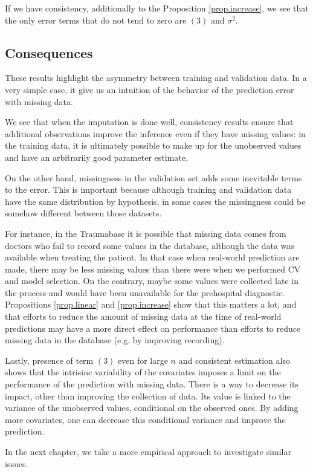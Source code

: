 If we have consistency, additionally to the Proposition \ref{prop.increase}, we see that the only error terms that do not tend to zero are $(3)$ and $\sigma^2$. 

		\subsection{Consequences}
These results highlight the asymmetry between training and validation data. In a very simple case, it give us an intuition of the behavior of the prediction error with missing data.

We see that when the imputation is done well, consistency results ensure that additional observations improve the inference even if they have missing values: in the training data, it is ultimately possible to make up for the unobserved values and have an arbitrarily good parameter estimate.

On the other hand, missingness in the validation set adds some inevitable terms to the error. This is important because although training and validation data have the same distribution by hypothesis, in some cases the missingness could be somehow different between those datasets.  

For instance, in the Traumabase it is possible that missing data comes from doctors who fail to record some values in the database, although the data was available when treating the patient. In that case when real-world prediction are made, there may be less missing values than there were when we performed CV and model selection. On the contrary, maybe some values were collected late in the process and would have been unavailable for the prehospital diagnostic. Propositions \ref{prop.linear} and \ref{prop.increase} show that this matters a lot, and that efforts to reduce the amount of missing data at the time of real-world predictions may have a more direct effect on performance than efforts to reduce missing data in the database (e.g. by improving recording). 

Lastly, presence of term $(3)$ even for large $n$ and consistent estimation also shows that the intrisinc variability of the covariates imposes a limit on the performance of the prediction with missing data. There is a way to decrease its impact, other than improving the collection of data. Its value is linked to the variance of the unobserved values, conditional on the observed ones. By adding more covariates, one can decrease this conditional variance and improve the prediction.

In the next chapter, we take a more empirical approach to investigate similar issues.